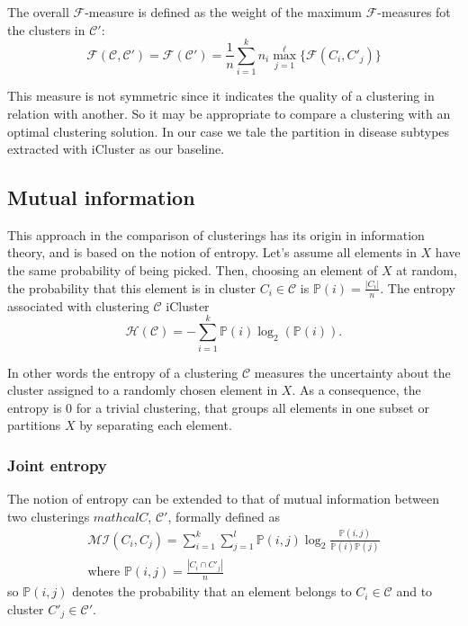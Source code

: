 The overall $\mathcal{F}$-measure is defined as the weight of the maximum $\mathcal{F}$-measures fot the clusters in $\mathcal{C}'$:
\begin{equation*}
    \mathcal{F}(\mathcal{C},\mathcal{C}')=\mathcal{F}(\mathcal{C}') = \frac{1}{n}\sum_{i=1}^k n_i\max_{j=1}^\ell\{\mathcal{F}(C_i,C'_j)\}
\end{equation*}

This measure is not symmetric since it indicates the quality of a clustering in relation with another. So it may be appropriate to compare a clustering with an optimal clustering solution. In our case we tale the partition in disease subtypes extracted with iCluster as our baseline.

\subsection{Mutual information}
This approach in the comparison of clusterings has its origin in information theory, and is based on the notion of entropy. Let's assume all elements in $X$ have the same probability of being picked. Then, choosing an element of $X$ at random, the probability that this element is in cluster $C_i\in\mathcal{C}$ is $\mathbb{P}(i)=\frac{|C_i|}{n}$. The entropy associated with clustering $\mathcal{C}$ iCluster
\begin{equation*}
    \mathcal{H}(\mathcal{C})=-\sum_{i=1}^k\mathbb{P}(i)\log_{2}{(\mathbb{P}(i))}.
\end{equation*}

In other words the entropy of a clustering $\mathcal{C}$ measures the uncertainty about the cluster assigned to a randomly chosen element in $X$. As a consequence, the entropy is 0 for a trivial clustering, that groups all elements in one subset or partitions $X$ by separating each element.

\subsubsection{Joint entropy}
The notion of entropy can be extended to that of mutual information between two clusterings $mathcal{C}$, $\mathcal{C}'$, formally defined as
\begin{equation*}
    \begin{gathered}
       \mathcal{MI}(C_i, C_j) = \sum_{i=1}^{k} \sum_{j=1}^{l} \mathbb{P}(i,j) \log_{2}{ \frac{\mathbb{P}(i,j)}{\mathbb{P}(i)\mathbb{P}(j)} }\\
       \text{where }\mathbb{P}(i,j)=\frac{|C_i\cap C'_j|}{n}
    \end{gathered}    
\end{equation*}
so $\mathbb{P}(i,j)$ denotes the probability that an element belongs to $C_i\in\mathcal{C}$ and to cluster $C'_j\in\mathcal{C}'$.

